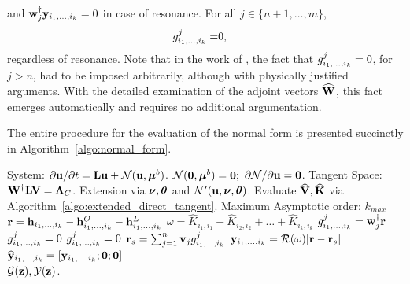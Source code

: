 and $\mathbf{w}^{\dagger}_{j}\mathbf{y}_{i_{1},\ldots,i_{k}} = 0$ in case of resonance. 
For all $j\in\{n+1,\ldots,m\}$, 
\begin{align}
	\label{eqn:resonance_modification2_Ok_std}
	g^{j}_{i_{1},\ldots,i_{k}} =&	0,
\end{align}
regardless of resonance. Note that in the work of \cite{vizzaccaro24}, the fact that $g^{j}_{i_{1},\ldots,i_{k}} =	0$, for $j>n$, had to be imposed arbitrarily, although with physically justified arguments. With the detailed examination of the adjoint vectors $\mathbf{\widehat{W}}$, this fact emerges automatically and requires no additional argumentation. 

The entire procedure for the evaluation of the normal form is presented succinctly in Algorithm~\ref{algo:normal_form}. 
 \begin{algorithm}
	\caption{Center--Manifold: Normal form}\label{algo:normal_form}
	\begin{algorithmic}[0]
		\Require System: $\partial \mathbf{u}/\partial t = \mathbf{L} \mathbf{u} + \mathcal{N}(\mathbf{u},\boldsymbol{\mu}^{b})$.
		\Ensure $\mathcal{N}(\mathbf{0},\boldsymbol{\mu}^{b}) = \mathbf{0};$ $\partial\mathcal{N}/\partial \mathbf{u} = \mathbf{0}$. 
		\Require Tangent Space: $\mathbf{W}^{\dagger}\mathbf{L} \mathbf{V} = \mathbf{\Lambda}_{C}$.
		\Require Extension via $\boldsymbol{\nu}, \boldsymbol{\theta}$ and $\mathcal{N}'(\mathbf{u},\boldsymbol{\nu},\boldsymbol{\theta})$.
		\State Evaluate $\widehat{\mathbf{V}},\mathbf{\widehat{K}}$ via Algorithm~\ref{algo:extended_direct_tangent}. 
		\Require Maximum Asymptotic order: $k_{max}$
				\State {}
				\State $\mathbf{r} = \mathbf{h}_{i_{1},\ldots,i_{k}} - \mathbf{h}^{O}_{i_{1},\ldots,i_{k}} - \mathbf{h}^{L}_{i_{1},\ldots,i_{k}}$ %
				\State $\omega = \widehat{K}_{i_{1},i_{1}} + \widehat{K}_{i_{2},i_{2}} + \ldots + \widehat{K}_{i_{k},i_{k}}$
				\State {}
						\State $g^{j}_{i_{1},\ldots,i_{k}} = \mathbf{w}^{\dagger}_{j}\mathbf{r}$
					\Else
						\State $g^{j}_{i_{1},\ldots,i_{k}} = 0$
					\EndIf
				\EndFor
					\State $g^{j}_{i_{1},\ldots,i_{k}} = 0$
				\EndFor
				\State {}
				\State $\mathbf{r}_{s} = \sum_{j=1}^{n}\mathbf{v}_{j}g^{j}_{i_{1},\ldots,i_{k}}$ 
				\State {}
				\State $\mathbf{y}_{i_{1},\ldots,i_{k}} = \mathcal{R}(\omega)[\mathbf{r} - \mathbf{r}_{s}]$ 
				\State $\widehat{\mathbf{y}}_{i_{1},\ldots,i_{k}} = [\mathbf{y}_{i_{1},\ldots,i_{k}}; \mathbf{0}; \mathbf{0}]$
			\EndFor
		\EndFor \\
		\Return $\mathcal{G}(\mathbf{z}), \mathcal{Y}(\mathbf{z})$.
	\end{algorithmic}
\end{algorithm}


